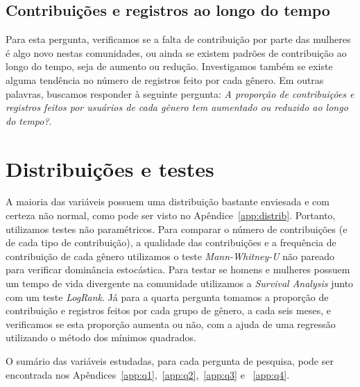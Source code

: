 \subsection{Contribuições e registros ao longo do tempo}

Para esta pergunta, verificamos se a falta de contribuição por parte das mulheres é algo novo nestas comunidades, ou ainda se existem padrões de contribuição ao longo do tempo, seja de aumento ou redução. Investigamos também se existe alguma tendência no número de registros feito por cada gênero. Em outras palavras, buscamos responder à seguinte pergunta: \textit{A proporção de contribuições e registros feitos por usuários de cada gênero tem aumentado ou reduzido ao longo do tempo?}. 

\section{Distribuições e testes}


A maioria das variáveis possuem uma distribuição bastante enviesada e com certeza não normal, como pode ser visto no Apêndice~\ref{app:distrib}. Portanto, utilizamos testes não paramétricos. Para comparar o número de contribuições (e de cada tipo de contribuição), a qualidade das contribuições e a frequência de contribuição de cada gênero utilizamos o teste \emph{Mann-Whitney-U} não pareado para verificar dominância estocástica. Para testar se homens e mulheres possuem um tempo de vida divergente na comunidade utilizamos a \textit{Survival Analysis} junto com um teste \emph{LogRank}. Já para a quarta pergunta tomamos a proporção de contribuição e registros feitos por cada grupo de gênero, a cada seis meses, e verificamos se esta proporção aumenta ou não, com a ajuda de uma regressão utilizando o método dos mínimos quadrados.

O sumário das variáveis estudadas, para cada pergunta de pesquisa, pode ser encontrada nos Apêndices~\ref{app:q1},~\ref{app:q2},~\ref{app:q3} e ~\ref{app:q4}.


